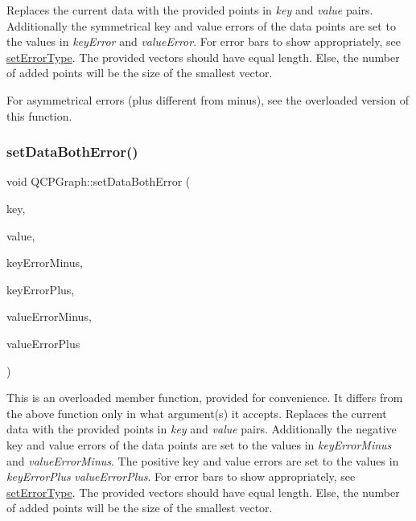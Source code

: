 Replaces the current data with the provided points in {\itshape key} and {\itshape value} pairs. Additionally the symmetrical key and value errors of the data points are set to the values in {\itshape key\+Error} and {\itshape value\+Error}. For error bars to show appropriately, see \mbox{\hyperlink{class_q_c_p_graph_ac3614d799c3894f2bc646e99c7f73d38}{set\+Error\+Type}}. The provided vectors should have equal length. Else, the number of added points will be the size of the smallest vector.

For asymmetrical errors (plus different from minus), see the overloaded version of this function. \mbox{\label{class_q_c_p_graph_abb75736ecdbf6e6a7501e1da64fb18cf}} 
\subsubsection{\texorpdfstring{set\+Data\+Both\+Error()}{setDataBothError()}\hspace{0.1cm}{\footnotesize\ttfamily [2/2]}}
{\footnotesize\ttfamily void Q\+C\+P\+Graph\+::set\+Data\+Both\+Error (\begin{DoxyParamCaption}\item[{const Q\+Vector$<$ double $>$ \&}]{key,  }\item[{const Q\+Vector$<$ double $>$ \&}]{value,  }\item[{const Q\+Vector$<$ double $>$ \&}]{key\+Error\+Minus,  }\item[{const Q\+Vector$<$ double $>$ \&}]{key\+Error\+Plus,  }\item[{const Q\+Vector$<$ double $>$ \&}]{value\+Error\+Minus,  }\item[{const Q\+Vector$<$ double $>$ \&}]{value\+Error\+Plus }\end{DoxyParamCaption})}

This is an overloaded member function, provided for convenience. It differs from the above function only in what argument(s) it accepts. Replaces the current data with the provided points in {\itshape key} and {\itshape value} pairs. Additionally the negative key and value errors of the data points are set to the values in {\itshape key\+Error\+Minus} and {\itshape value\+Error\+Minus}. The positive key and value errors are set to the values in {\itshape key\+Error\+Plus} {\itshape value\+Error\+Plus}. For error bars to show appropriately, see \mbox{\hyperlink{class_q_c_p_graph_ac3614d799c3894f2bc646e99c7f73d38}{set\+Error\+Type}}. The provided vectors should have equal length. Else, the number of added points will be the size of the smallest vector. \mbox{\label{class_q_c_p_graph_abce9f07c0d722bc3e4fa7bd73c7e5dfa}} 
